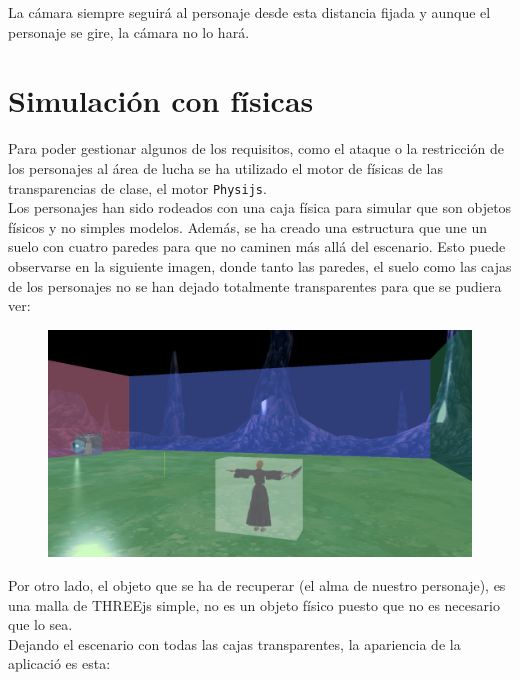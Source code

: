 \documentclass[11pt,a4paper]{article}
\begin{document}
La cámara siempre seguirá al personaje desde esta distancia fijada y aunque el personaje se gire, la cámara no lo hará.  

\section{Simulación con físicas}

Para poder gestionar algunos de los requisitos, como el ataque o la restricción de los personajes al área de lucha se ha utilizado el motor de físicas de las transparencias de clase, el motor \texttt{Physijs}.\\

Los personajes han sido rodeados con una caja física para simular que son objetos físicos y no simples modelos. 
Además, se ha creado una estructura que une un suelo con cuatro paredes para que no caminen más allá del escenario. Esto puede observarse en la siguiente imagen, donde tanto las paredes, el suelo como las cajas de los personajes no se han dejado totalmente transparentes para que se pudiera ver:

\begin{figure}[H]
	\centering
	\includegraphics[scale=0.23]{img/fisica.png}
\end{figure}

Por otro lado, el objeto que se ha de recuperar (el alma de nuestro personaje), es una malla de THREEjs simple, no es un objeto físico puesto que no es necesario que lo sea.\\

Dejando el escenario con todas las cajas transparentes, la apariencia de la aplicació es esta:
\end{document}

